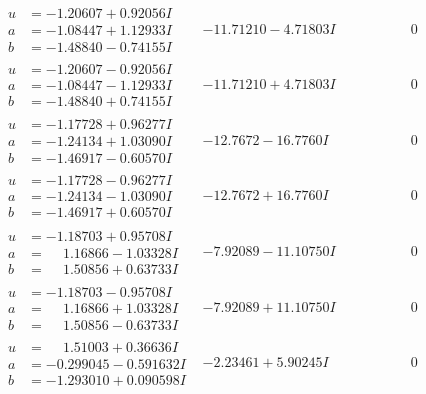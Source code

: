 \documentclass[1p]{elsarticle_modified}
\theoremstyle{definition}
\begin{document}
$$\begin{array}{c|c|c}
\begin{aligned}
u &= -1.20607 + 0.92056 I \\
a &= -1.08447 + 1.12933 I \\
b &= -1.48840 - 0.74155 I\end{aligned}
 & -11.71210 - 4.71803 I & \phantom{-0.000000 } 0 \\ \hline\begin{aligned}
u &= -1.20607 - 0.92056 I \\
a &= -1.08447 - 1.12933 I \\
b &= -1.48840 + 0.74155 I\end{aligned}
 & -11.71210 + 4.71803 I & \phantom{-0.000000 } 0 \\ \hline\begin{aligned}
u &= -1.17728 + 0.96277 I \\
a &= -1.24134 + 1.03090 I \\
b &= -1.46917 - 0.60570 I\end{aligned}
 & -12.7672 - 16.7760 I & \phantom{-0.000000 } 0 \\ \hline\begin{aligned}
u &= -1.17728 - 0.96277 I \\
a &= -1.24134 - 1.03090 I \\
b &= -1.46917 + 0.60570 I\end{aligned}
 & -12.7672 + 16.7760 I & \phantom{-0.000000 } 0 \\ \hline\begin{aligned}
u &= -1.18703 + 0.95708 I \\
a &= \phantom{-}1.16866 - 1.03328 I \\
b &= \phantom{-}1.50856 + 0.63733 I\end{aligned}
 & -7.92089 - 11.10750 I & \phantom{-0.000000 } 0 \\ \hline\begin{aligned}
u &= -1.18703 - 0.95708 I \\
a &= \phantom{-}1.16866 + 1.03328 I \\
b &= \phantom{-}1.50856 - 0.63733 I\end{aligned}
 & -7.92089 + 11.10750 I & \phantom{-0.000000 } 0 \\ \hline\begin{aligned}
u &= \phantom{-}1.51003 + 0.36636 I \\
a &= -0.299045 - 0.591632 I \\
b &= -1.293010 + 0.090598 I\end{aligned}
 & -2.23461 + 5.90245 I & \phantom{-0.000000 } 0 \\ \hline\begin{aligned}

\end{aligned}
\end{array}$$
\end{document}
